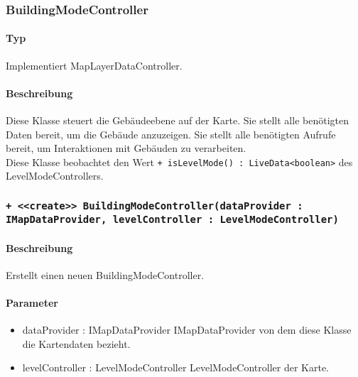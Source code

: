 \subsubsection{BuildingModeController}
\paragraph*{Typ}
Implementiert MapLayerDataController.
\paragraph*{Beschreibung}
Diese Klasse steuert die Gebäudeebene auf der Karte. Sie stellt alle benötigten Daten bereit, um die Gebäude anzuzeigen. 
Sie stellt alle benötigten Aufrufe bereit, um Interaktionen mit Gebäuden zu verarbeiten.\\
Diese Klasse beobachtet den Wert \texttt{+ isLevelMode() : LiveData<boolean>} des LevelModeControllers.

\subsubsection*{\texttt{+ <<create>> BuildingModeController(dataProvider : IMapDataProvider, levelController : LevelModeController)}}%
\paragraph*{Beschreibung}
Erstellt einen neuen BuildingModeController.
\paragraph*{Parameter}
\begin{itemize}
    \item dataProvider : IMapDataProvider IMapDataProvider von dem diese Klasse die Kartendaten bezieht.
    \item levelController : LevelModeController LevelModeController der Karte.
\end{itemize}
